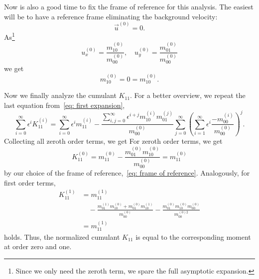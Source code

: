 Now is also a good time to fix the frame of reference for this analysis. The easiest will be to have a reference frame eliminating the background velocity:
\begin{equation}
  \vec{u}^{(0)} = 0.
\end{equation}
As\footnote{Since we only need the zeroth term, we spare the full asymptotic expansion.}
\begin{equation}
  u_x^{(0)} = \frac{m_{10}^{(0)}}{m_{00}^{(0)}}, \quad u_y^{(0)} = \frac{m_{01}^{(0)}}{m_{00}^{(0)}}
\end{equation}
we get
\begin{equation}
  \label{eq: frame of reference}
  m_{10}^{(0)} = 0 = m_{10}^{(0)}.
\end{equation}

Now we finally analyze the cumulant $K_{11}$.
For a better overview, we repeat the last equation from~\eqref{eq: first expansion},
\begin{equation}
  \sum_{i=0}^\infty \epsilon^i K_{11}^{(i)}
   = \sum_{i=0}^\infty \epsilon^i m_{11}^{(i)} -
  \frac{\sum_{i,j=0}^\infty \epsilon^{i+j} m_{10}^{(i)}m_{01}^{(j)}}
      {m_{00}^{(0)}}
  \sum_{j=0}^\infty {\left(\sum_{i=1}^\infty \epsilon^i \frac{ - m_{00}^{(i)}}{ m_{00}^{(0)}}\right)}^j.
\end{equation}
Collecting all zeroth order terms, we get
For zeroth order terms, we get
\begin{equation}
  K_{11}^{(0)} = m_{11}^{(0)} - \frac{m_{01}^{(0)}m_{10}^{(0)}}{m_{00}^{(0)}} =  m_{11}^{(0)}
\end{equation}
by our choice of the frame of reference,~\eqref{eq: frame of reference}.
Analogously, for first order terms,
\begin{equation}
  \begin{aligned}
    K_{11}^{(1)} & = m_{11}^{(1)} \\
    &\quad - \frac{m_{01}^{(1)}m_{10}^{(0)}+m_{01}^{(0)}m_{10}^{(1)}}{m_{00}^{(0)}}
    -\frac{m_{01}^{(0)}m_{10}^{(0)}m_{00}^{(0)}}{m_{00}^{(0)2}}  \\
    &= m_{11}^{(1)}
  \end{aligned}
\end{equation}
holds.
Thus, the normalized cumulant $K_{11}$ is equal to the corresponding moment at order zero and one.

